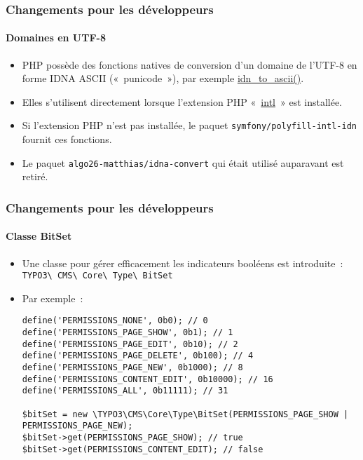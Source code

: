 \begin{frame}[fragile]
	\frametitle{Changements pour les développeurs}
	\framesubtitle{Domaines en UTF-8}

	\begin{itemize}
		\item PHP possède des fonctions natives de conversion d'un domaine de l'UTF-8 en forme IDNA ASCII
			(«~punicode~»), par exemple \href{https://www.php.net/manual/en/function.idn-to-ascii.php}{idn\_to\_ascii()}.

		\item Elles s'utilisent directement lorsque l'extension PHP
			«~\href{https://www.php.net/manual/en/book.intl.php}{intl}~» est installée.

		\item Si l'extension PHP n'est pas installée, le paquet \texttt{symfony/polyfill-intl-idn}
			fournit ces fonctions.

		\item Le paquet \texttt{algo26-matthias/idna-convert} qui était utilisé auparavant est retiré.

	\end{itemize}

\end{frame}


\begin{frame}[fragile]
	\frametitle{Changements pour les développeurs}
	\framesubtitle{Classe BitSet}

	\lstset{basicstyle=\tiny\ttfamily}

	\begin{itemize}
		\item Une classe pour gérer efficacement les indicateurs booléens est introduite~:\newline
			\texttt{TYPO3\textbackslash
				CMS\textbackslash
				Core\textbackslash
				Type\textbackslash
				BitSet}

		\item Par exemple~:

\begin{lstlisting}
define('PERMISSIONS_NONE', 0b0); // 0
define('PERMISSIONS_PAGE_SHOW', 0b1); // 1
define('PERMISSIONS_PAGE_EDIT', 0b10); // 2
define('PERMISSIONS_PAGE_DELETE', 0b100); // 4
define('PERMISSIONS_PAGE_NEW', 0b1000); // 8
define('PERMISSIONS_CONTENT_EDIT', 0b10000); // 16
define('PERMISSIONS_ALL', 0b11111); // 31

$bitSet = new \TYPO3\CMS\Core\Type\BitSet(PERMISSIONS_PAGE_SHOW | PERMISSIONS_PAGE_NEW);
$bitSet->get(PERMISSIONS_PAGE_SHOW); // true
$bitSet->get(PERMISSIONS_CONTENT_EDIT); // false
\end{lstlisting}

	\end{itemize}

\end{frame}

